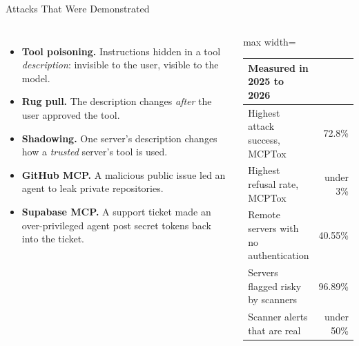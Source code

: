 \begin{frame}{Attacks That Were Demonstrated}
    \begin{columns}[T,onlytextwidth]
        \begin{itemize}\itemsep0.45em
            \item \textbf{Tool poisoning.} Instructions hidden in a tool \emph{description}: invisible to the user, visible to the model.
            \item \textbf{Rug pull.} The description changes \emph{after} the user approved the tool.
            \item \textbf{Shadowing.} One server's description changes how a \emph{trusted} server's tool is used.
            \item \textbf{GitHub MCP.} A malicious public issue led an agent to leak private repositories.
            \item \textbf{Supabase MCP.} A support ticket made an over-privileged agent post secret tokens back into the ticket.
        \end{itemize}
        \centering
        \small
        \renewcommand{\arraystretch}{1.2}
        \begin{adjustbox}{max width=\linewidth}\begin{tabular}{>{\raggedright\arraybackslash}p{3.7cm}r}
            \toprule
            \textbf{Measured in 2025 to 2026} & \\
            \midrule
            Highest attack success, MCPTox & 72.8\% \\
            Highest refusal rate, MCPTox & under 3\% \\
            Remote servers with no authentication & 40.55\% \\
            Servers flagged risky by scanners & 96.89\% \\
            Scanner alerts that are real & under 50\% \\
            \bottomrule
        \end{tabular}\end{adjustbox}
    \end{columns}
    \vspace{0.3em}
\end{frame}

